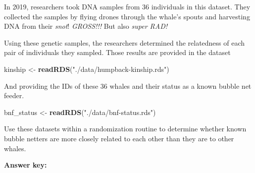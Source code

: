 \documentclass[
]{book}
\newenvironment{Shaded}{\begin{snugshade}}{\end{snugshade}}
\newcommand{\KeywordTok}[1]{\textcolor[rgb]{0.13,0.29,0.53}{\textbf{#1}}}
\newcommand{\NormalTok}[1]{#1}
\newcommand{\StringTok}[1]{\textcolor[rgb]{0.31,0.60,0.02}{#1}}
\begin{document}
In 2019, researchers took DNA samples from 36 individuals in this dataset. They collected the samples by flying drones through the whale's spouts and harvesting DNA from their \emph{snot}! \emph{GROSS!!!} But also \emph{super RAD!}

Using these genetic samples, the researchers determined the relatedness of each pair of individuals they sampled. Those results are provided in the dataset

\begin{Shaded}
\begin{Highlighting}[]
\NormalTok{kinship <-}\StringTok{ }\KeywordTok{readRDS}\NormalTok{(}\StringTok{"./data/humpback-kinship.rds"}\NormalTok{)}
\end{Highlighting}
\end{Shaded}

And providing the IDs of these 36 whales and their status as a known bubble net feeder.

\begin{Shaded}
\begin{Highlighting}[]
\NormalTok{bnf_status <-}\StringTok{ }\KeywordTok{readRDS}\NormalTok{(}\StringTok{"./data/bnf-status.rds"}\NormalTok{)}
\end{Highlighting}
\end{Shaded}

Use these datasets within a randomization routine to determine whether known bubble netters are more closely related to each other than they are to other whales.

\textbf{Answer key:}
\end{document}
